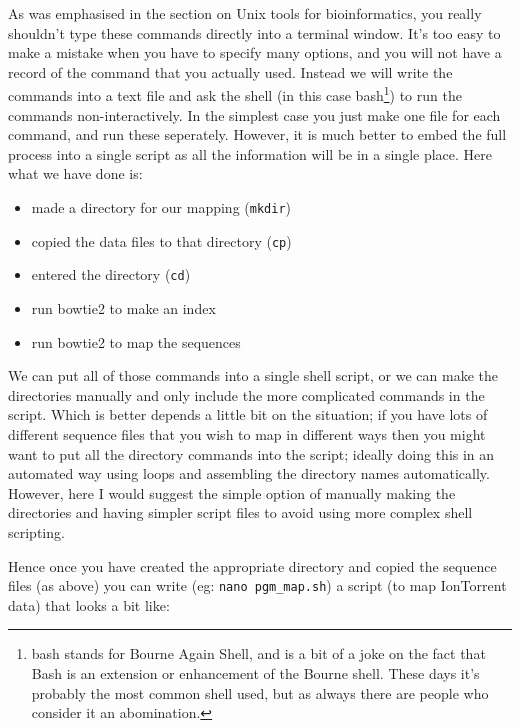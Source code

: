 \documentclass[11pt]{article}
\begin{document}
As was emphasised in the section on Unix tools for bioinformatics, you really
shouldn't type these commands directly into a terminal window. It's too easy
to make a mistake when you have to specify many options, and you will not
have a record of the command that you actually used. Instead we will write
the commands into a text file and ask the shell (in this case
bash\footnote{bash stands for Bourne Again Shell, and is a bit of a joke on the
fact that Bash is an extension or enhancement of the Bourne shell. These days
it's probably the most common shell used, but as always there are people who
consider it an abomination.}) to run the commands non-interactively. In the simplest case
you just make one file for each command, and run these seperately. However,
it is much better to embed the full process into a single script as all the
information will be in a single place. Here what we have done is:

\begin{itemize}
\item made a directory for our mapping (\texttt{mkdir})
\item copied the data files to that directory (\texttt{cp})
\item entered the directory (\texttt{cd})
\item run bowtie2 to make an index
\item run bowtie2 to map the sequences
\end{itemize}

We can put all of those commands into a single shell script, or we can make
the directories manually and only include the more complicated commands in
the script. Which is better depends a little bit on the situation; if you
have lots of different sequence files that you wish to map in different ways
then you might want to put all the directory commands into the script;
ideally doing this in an automated way using loops and
assembling the directory names automatically. However, here I would suggest
the simple option of manually making the directories and having simpler
script files to avoid using more complex shell scripting.

Hence once you have created the appropriate directory and copied the sequence
files (as above) you can write (eg: \texttt{nano pgm\_map.sh}) a script (to map
IonTorrent data) that looks a bit like:
\end{document}
